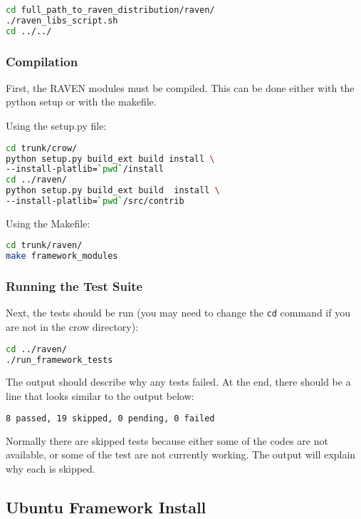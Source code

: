 \begin{lstlisting}[language=bash]
cd full_path_to_raven_distribution/raven/
./raven_libs_script.sh
cd ../../
\end{lstlisting}

\subsubsection{Compilation}

First, the RAVEN modules must be compiled. This can be done either
with the python setup or with the makefile.

Using the setup.py file:
\begin{lstlisting}[language=bash]
cd trunk/crow/
python setup.py build_ext build install \
--install-platlib=`pwd`/install
cd ../raven/
python setup.py build_ext build  install \
--install-platlib=`pwd`/src/contrib
\end{lstlisting}

Using the Makefile:
\begin{lstlisting}[language=bash]
cd trunk/raven/
make framework_modules
\end{lstlisting}

\subsubsection{Running the Test Suite}

Next, the tests should be run (you may need to change the \texttt{cd}
command if you are not in the crow directory):

\begin{lstlisting}[language=bash]
cd ../raven/
./run_framework_tests
\end{lstlisting}

The output should describe why any tests failed.
%
At the end, there should be a line that looks similar to the output below:
\begin{lstlisting}[language=bash]
8 passed, 19 skipped, 0 pending, 0 failed
\end{lstlisting}

Normally there are skipped tests because either some of the codes are
not available, or some of the test are not currently working.  The
output will explain why each is skipped.

\subsection{Ubuntu Framework Install}

